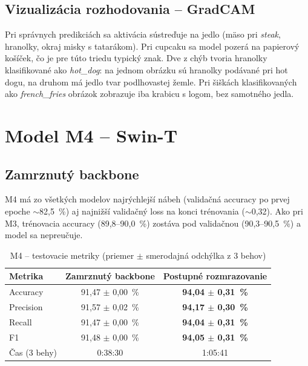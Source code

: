 \subsection{Vizualizácia rozhodovania -- GradCAM}


Pri správnych predikciách sa aktivácia sústreďuje na jedlo (mäso pri
\emph{steak}, hranolky, okraj misky s tatarákom). Pri cupcaku sa model
pozerá na papierový košíček, čo je pre túto triedu typický znak. Dve
z chýb tvoria hranolky klasifikované ako \emph{hot\_dog}: na jednom obrázku
sú hranolky podávané pri hot dogu, na druhom má jedlo tvar podlhovastej
žemle. Pri šiškách klasifikovaných ako \emph{french\_fries} obrázok
zobrazuje iba krabicu s logom, bez samotného jedla.

\section{Model M4 -- Swin-T}
\label{sec:m4}

\subsection{Zamrznutý backbone}


M4 má zo všetkých modelov najrýchlejší nábeh (validačná accuracy po prvej
epoche $\sim$82,5~\%) aj najnižší validačný loss na konci trénovania
($\sim$0,32). Ako pri M3, trénovacia accuracy (89,8--90,0~\%) zostáva pod
validačnou (90,3--90,5~\%) a model sa nepreučuje.

\begin{table}[H]
    \centering
    \caption{M4 -- testovacie metriky (priemer $\pm$ smerodajná odchýlka z 3 behov)}
    \label{tab:m4-metrics}
    \begin{tabular}{lcc}
        \toprule
        Metrika & Zamrznutý backbone & Postupné rozmrazovanie \\
        \midrule
        Accuracy  & 91,47 $\pm$ 0,00~\% & \textbf{94,04 $\pm$ 0,31~\%} \\
        Precision & 91,57 $\pm$ 0,02~\% & \textbf{94,17 $\pm$ 0,30~\%} \\
        Recall    & 91,47 $\pm$ 0,00~\% & \textbf{94,04 $\pm$ 0,31~\%} \\
        F1        & 91,48 $\pm$ 0,00~\% & \textbf{94,05 $\pm$ 0,31~\%} \\
        Čas (3 behy) & 0:38:30 & 1:05:41 \\
        \bottomrule
    \end{tabular}
\end{table}

